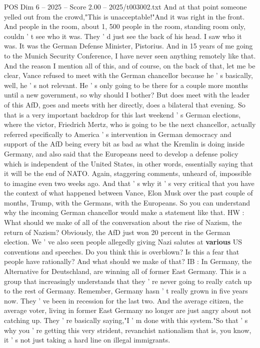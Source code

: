 \begin{textsample}{POS Dim 6 – 2025 – Score 2.00 – 2025/t003002.txt}
And at that point someone yelled out from the crowd,"This is unacceptable!"And it was right in the front.
And people in the room, about 1, 500 people in the room, standing room only, couldn ' t see who it was.
They ' d just see the back of his head.
I saw who it was.
It was the German Defense Minister, Pistorius.
And in 15 years of me going to the Munich Security Conference, I have never seen anything remotely like that.
And the reason I mention all of this, and of course, on the back of that, let me be clear, Vance refused to meet with the German chancellor because he ' s basically, well, he ' s not relevant.
He ' s only going to be there for a couple more months until a new government, so why should I bother?
But does meet with the leader of this AfD, goes and meets with her directly, does a bilateral that evening.
So that is a very important backdrop for this last weekend ' s German elections, where the victor, Friedrich Mertz, who is going to be the next chancellor, actually referred specifically to America ' s intervention in German democracy and support of the AfD being every bit as bad as what the Kremlin is doing inside Germany, and also said that the Europeans need to develop a defense policy which is independent of the United States, in other words, essentially saying that it will be the end of NATO.
Again, staggering comments, unheard of, impossible to imagine even two weeks ago.
And that ' s why it ' s very critical that you have the context of what happened between Vance, Elon Musk over the past couple of months, Trump, with the Germans, with the Europeans.
So you can understand why the incoming German chancellor would make a statement like that.
HW : What should we make of all of the conversation about the rise of Nazism, the return of Nazism?
Obviously, the AfD just won 20 percent in the German election.
We ' ve also seen people allegedly giving Nazi salutes at \textbf{various} US conventions and speeches.
Do you think this is overblown?
Is this a fear that people have rationally?
And what should we make of that?
IB : In Germany, the Alternative for Deutschland, are winning all of former East Germany.
This is a group that increasingly understands that they ' re never going to really catch up to the rest of Germany.
Remember, Germany hasn ' t really grown in five years now.
They ' ve been in recession for the last two.
And the average citizen, the average voter, living in former East Germany no longer are just angry about not catching up.
They ' re basically saying,"I ' m done with this system."So that ' s why you ' re getting this very strident, revanchist nationalism that is, you know, it ' s not just taking a hard line on illegal immigrants.

\end{textsample}
